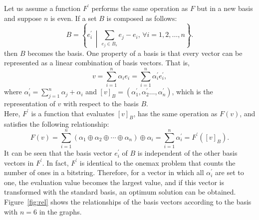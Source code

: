 Let us assume a function $ F^\prime $ performs the same operation as $ F $ but in a new basis and suppose $ n $ is even. If a set $ B $ is composed as follows:
\begin{equation*}
B=\left\{e_i^\prime \,\middle|\, \sum_{e_j\in B_s} e_j-e_i,\, \forall i= 1,2,\ldots,n \right\}.
\end{equation*}
then $ B $ becomes the basis. One property of a basis is that every vector can be represented as a linear combination of basis vectors. That is,
\begin{equation*}
v=\sum_{i=1}^{n}{\alpha_ie_i}=\sum_{i=1}^{n}{\alpha_i^\prime e_i^\prime},
\end{equation*}
where $ \alpha_i^\prime=\sum_{j=1}^{n}\alpha_j+\alpha_i $ and $ \left[v\right]_B=\left(\alpha_1^\prime,\alpha_2^\prime\ldots,\alpha_n^\prime\right) $, which is the representation of $ v $ with respect to the basis $ B $.\\
Here, $ F^\prime $ is a function that evaluates $ \left[v\right]_B $, has the same operation as $ F\left(v\right) $, and satisfies the following relationship:
\begin{equation*}
F\left(v\right)=\sum_{i=1}^{n}{\left(\alpha_1\oplus\alpha_2\oplus\cdots\oplus\alpha_n\right)\oplus\alpha_i}=\sum_{i=1}^{n}\alpha_i^\prime=F^\prime\left(\left[v\right]_B\right) .
\end{equation*}
It can be seen that the basis vector $ e_i^\prime $ of $ B $ is independent of the other basis vectors in $ F^\prime $. In fact, $ F^\prime  $ is identical to the onemax problem that counts the number of ones in a bitstring. Therefore, for a vector in which all $ \alpha_i^\prime $ are set to one, the evaluation value becomes the largest value, and if this vector is transformed with the standard basis, an optimum solution can be obtained. Figure~\ref{fig:rel} shows the relationships of the basis vectors according to the basis with $ n = 6 $ in the graphs.
